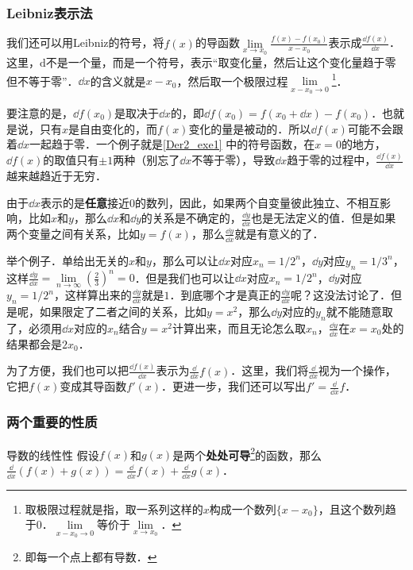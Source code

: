 \subsubsection{Leibniz表示法}


我们还可以用Leibniz的符号，将$f(x)$的导函数$\lim\limits_{x\to x_0}\frac{f(x)-f(x_0)}{x-x_0}$表示成$\frac{\dd f(x)}{\dd x}$．这里，$\mathrm{d}$不是一个量，而是一个符号，表示“取变化量，然后让这个变化量趋于零但不等于零”．$\dd x$的含义就是$x-x_0$，然后取一个极限过程$\lim\limits_{x-x_0\to 0}$\footnote{取极限过程就是指，取一系列这样的$x$构成一个数列$\{x-x_0\}$，且这个数列趋于$0$．$\lim\limits_{x-x_0\to 0}$等价于$\lim\limits_{x\to x_0}$．}．

要注意的是，$\dd f(x_0)$是取决于$\dd x$的，即$\dd f(x_0)=f(x_0+\dd x)-f(x_0)$．也就是说，只有$x$是自由变化的，而$f(x)$变化的量是被动的．所以$\dd f(x)$可能不会跟着$\dd x$一起趋于零．一个例子就是\autoref{Der2_exe1} 中的符号函数，在$x=0$的地方，$\dd f(x)$的取值只有$\pm 1$两种（别忘了$\dd x$不等于零），导致$\dd x$趋于零的过程中，$\frac{\dd f(x)}{\dd x}$越来越趋近于无穷．


由于$\dd x$表示的是\textbf{任意}接近$0$的数列，因此，如果两个自变量彼此独立、不相互影响，比如$x$和$y$，那么$\dd x$和$\dd y$的关系是不确定的，$\frac{\dd y}{\dd x}$也是无法定义的值．但是如果两个变量之间有关系，比如$y=f(x)$，那么$\frac{\dd y}{\dd x}$就是有意义的了．

举个例子．单给出无关的$x$和$y$，那么可以让$\dd x$对应$x_n=1/2^n$，$\dd y$对应$y_n=1/3^n$，这样$\frac{\dd y}{\dd x}=\lim\limits_{n\to\infty}(\frac{2}{3})^n=0$．但是我们也可以让$\dd x$对应$x_n=1/2^n$，$\dd y$对应$y_n=1/2^n$，这样算出来的$\frac{\dd y}{\dd x}$就是$1$．到底哪个才是真正的$\frac{\dd y}{\dd x}$呢？这没法讨论了．但是呢，如果限定了二者之间的关系，比如$y=x^2$，那么$\dd y$对应的$y_n$就不能随意取了，必须用$\dd x$对应的$x_n$结合$y=x^2$计算出来，而且无论怎么取$x_n$，$\frac{\dd y}{\dd x}$在$x=x_0$处的结果都会是$2x_0$．

为了方便，我们也可以把$\frac{\dd f(x)}{\dd x}$表示为$\frac{\dd}{\dd x}f(x)$．这里，我们将$\frac{\dd}{\dd x}$视为一个操作，它把$f(x)$变成其导函数$f'(x)$．更进一步，我们还可以写出$f'=\frac{\dd}{\dd x}f$．


\subsubsection{两个重要的性质}

\begin{theorem}{导数的线性性}\label{Der2_the2}
假设$f(x)$和$g(x)$是两个\textbf{处处可导}\footnote{即每一个点上都有导数．}的函数，那么$\frac{\dd}{\dd x}(f(x)+g(x))=\frac{\dd}{\dd x}f(x)+\frac{\dd}{\dd x}g(x)$．
\end{theorem}

